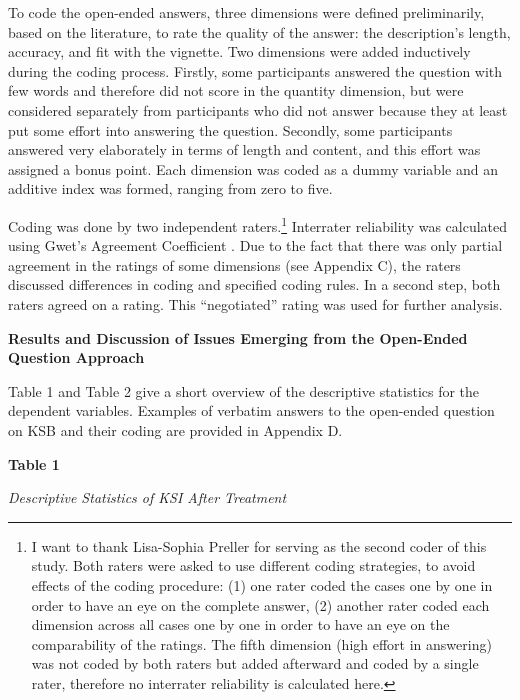 \documentclass{article}
\begin{document}
To code the open-ended answers, three dimensions were defined preliminarily, based on the literature, to rate the quality of the answer: the description's length, accuracy, and fit with the vignette. Two dimensions were added inductively during the coding process. Firstly, some participants answered the question with few words and therefore did not score in the quantity dimension, but were considered separately from participants who did not answer because they at least put some effort into answering the question. Secondly, some participants answered very elaborately in terms of length and content, and this effort was assigned a bonus point. Each dimension was coded as a dummy variable and an additive index was formed, ranging from zero to five. 

Coding was done by two independent raters.\footnote{I want to thank Lisa-Sophia Preller for serving as the second coder of this study. Both raters were asked to use different coding strategies, to avoid effects of the coding procedure: (1) one rater coded the cases one by one in order to have an eye on the complete answer, (2) another rater coded each dimension across all cases one by one in order to have an eye on the comparability of the ratings. The fifth dimension (high effort in answering) was not coded by both raters but added afterward and coded by a single rater, therefore no interrater reliability is calculated here.} Interrater reliability was calculated using Gwet's Agreement Coefficient \parencite[][AC]{Gwet2014}. Due to the fact that there was only partial agreement in the ratings of some dimensions (see Appendix C), the raters discussed differences in coding and specified coding rules. In a second step, both raters agreed on a rating. This “negotiated” rating was used for further analysis.



\textbf{Results and Discussion of Issues Emerging from the Open-Ended Question Approach}

Table 1 and Table 2 give a short overview of the descriptive statistics for the dependent variables. Examples of verbatim answers to the open-ended question on KSB and their coding are provided in Appendix D.

\textbf{Table 1}

\emph{Descriptive Statistics of KSI After Treatment}
\end{document}
